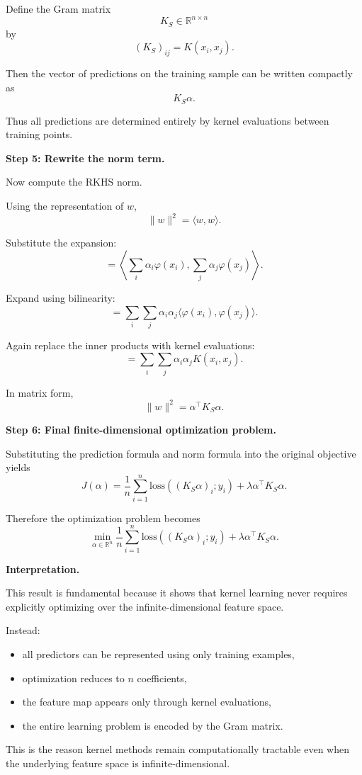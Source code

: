 \documentclass[11pt]{article}
\newcommand{\R}{\mathbb{R}}
\begin{document}
\begin{enumerate}
\begin{solutionbox}
Define the Gram matrix
\[
K_S\in\R^{n\times n}
\]
by
\[
(K_S)_{ij}
=
K(x_i,x_j).
\]

Then the vector of predictions on the training sample can be written compactly as
\[
K_S\alpha.
\]

Thus all predictions are determined entirely by kernel evaluations between training points.

\medskip

\textbf{Step 5: Rewrite the norm term.}

Now compute the RKHS norm.

Using the representation of $w$,
\[
\|w\|^2
=
\langle w,w\rangle.
\]

Substitute the expansion:
\[
=
\left\langle
\sum_i\alpha_i\varphi(x_i),
\sum_j\alpha_j\varphi(x_j)
\right\rangle.
\]

Expand using bilinearity:
\[
=
\sum_i\sum_j
\alpha_i\alpha_j
\langle
\varphi(x_i),
\varphi(x_j)
\rangle.
\]

Again replace the inner products with kernel evaluations:
\[
=
\sum_i\sum_j
\alpha_i\alpha_j
K(x_i,x_j).
\]

In matrix form,
\[
\boxed{
\|w\|^2
=
\alpha^\top K_S\alpha.
}
\]

\medskip

\textbf{Step 6: Final finite-dimensional optimization problem.}

Substituting the prediction formula and norm formula into the original objective yields
\[
J(\alpha)
=
\frac1n
\sum_{i=1}^n
\mathrm{loss}((K_S\alpha)_i;y_i)
+
\lambda\alpha^\top K_S\alpha.
\]

Therefore the optimization problem becomes
\[
\boxed{
\min_{\alpha\in\R^n}
\frac1n
\sum_{i=1}^n
\mathrm{loss}((K_S\alpha)_i;y_i)
+
\lambda\alpha^\top K_S\alpha.
}
\]

\medskip

\textbf{Interpretation.}

This result is fundamental because it shows that kernel learning never requires explicitly optimizing over the infinite-dimensional feature space.

Instead:
\begin{itemize}
    \item all predictors can be represented using only training examples,
    \item optimization reduces to $n$ coefficients,
    \item the feature map appears only through kernel evaluations,
    \item the entire learning problem is encoded by the Gram matrix.
\end{itemize}

This is the reason kernel methods remain computationally tractable even when the underlying feature space is infinite-dimensional.

\end{solutionbox}

\end{enumerate}
\end{document}

